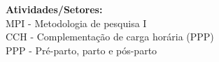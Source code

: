 {\fontsize{10pt}{12pt}\selectfont
\noindent
\textbf{Atividades/Setores:}\\
MPI - Metodologia de pesquisa I\\
CCH - Complementação de carga horária (PPP)\\
PPP - Pré-parto, parto e pós-parto
}